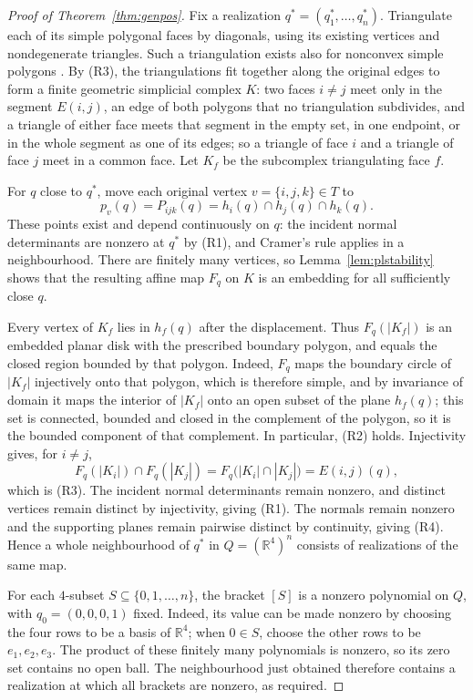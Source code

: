 \documentclass[11pt,reqno]{amsart}
\theoremstyle{plain}
\theoremstyle{definition}
\newcommand{\RR}{\mathbb{R}}
\newcommand{\bra}[1]{[#1]}
\begin{document}
\begin{proof}[Proof of Theorem~\ref{thm:genpos}]
Fix a realization $q^*=(q_1^*,\dots,q_n^*)$. Triangulate each of its simple polygonal faces by
diagonals, using its existing vertices and nondegenerate triangles. Such a triangulation exists
also for nonconvex simple polygons \cite{Meisters1975}. By (R3), the triangulations fit together
along the original edges to form a finite geometric simplicial complex $K$: two faces $i\ne j$ meet
only in the segment $E(i,j)$, an edge of both polygons that no triangulation subdivides, and a
triangle of either face meets that segment in the empty set, in one endpoint, or in the whole
segment as one of its edges; so a triangle of face $i$ and a triangle of face $j$ meet in a common
face. Let $K_f$ be the subcomplex triangulating face $f$.

For $q$ close to $q^*$, move each original vertex $v=\{i,j,k\}\in T$ to
\[
  p_v(q)=P_{ijk}(q)=h_i(q)\cap h_j(q)\cap h_k(q).
\]
These points exist and depend continuously on $q$: the incident normal determinants are nonzero
at $q^*$ by (R1), and Cramer's rule applies in a neighbourhood. There are finitely many vertices,
so Lemma~\ref{lem:plstability} shows that the resulting affine map $F_q$ on $K$ is an embedding
for all sufficiently close $q$.

Every vertex of $K_f$ lies in $h_f(q)$ after the displacement. Thus $F_q(|K_f|)$ is an embedded
planar disk with the prescribed boundary polygon, and equals the closed region bounded by that
polygon. Indeed, $F_q$ maps the boundary circle of $|K_f|$ injectively onto that polygon, which is
therefore simple, and by invariance of domain it maps the interior of $|K_f|$ onto an open subset
of the plane $h_f(q)$; this set is connected, bounded and closed in the complement of the
polygon, so it is the bounded component of that complement. In particular, (R2) holds.
Injectivity gives, for $i\ne j$,
\[
  F_q(|K_i|)\cap F_q(|K_j|)
  =F_q\bigl(|K_i|\cap |K_j|\bigr)=E(i,j)(q),
\]
which is (R3). The incident normal determinants remain nonzero, and distinct vertices remain
distinct by injectivity, giving (R1). The normals remain nonzero and the supporting planes
remain pairwise distinct by continuity, giving (R4). Hence a whole neighbourhood of $q^*$ in
$Q=(\RR^4)^n$ consists of realizations of the same map.

For each $4$-subset $S\subseteq\{0,1,\dots,n\}$, the bracket $\bra{S}$ is a nonzero polynomial
on $Q$, with $q_0=(0,0,0,1)$ fixed. Indeed, its value can be made nonzero by choosing the four
rows to be a basis of $\RR^4$; when $0\in S$, choose the other rows to be $e_1,e_2,e_3$.
The product of these finitely many polynomials is nonzero, so its zero set contains no open ball.
The neighbourhood just obtained therefore contains a realization at which all brackets are
nonzero, as required.
\end{proof}
\end{document}
